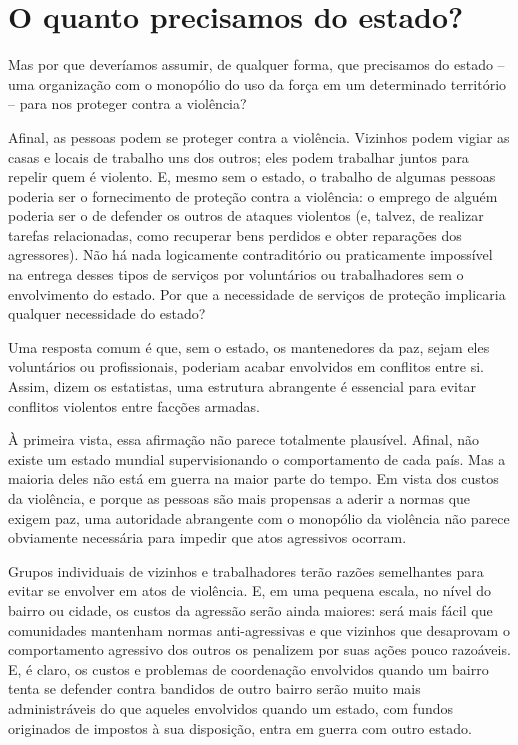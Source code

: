 \section{O quanto precisamos do estado?}

Mas por que deveríamos assumir, de qualquer forma, que precisamos do estado -- uma organização com o monopólio do uso da força em um determinado território -- para nos proteger contra a violência? 

Afinal, as pessoas podem se proteger contra a violência. Vizinhos podem vigiar as casas e locais de trabalho uns dos outros; eles podem trabalhar juntos para repelir quem é violento. E, mesmo sem o estado, o trabalho de algumas pessoas poderia ser o fornecimento de proteção contra a violência: o emprego de alguém poderia ser o de defender os outros de ataques violentos (e, talvez, de realizar tarefas relacionadas, como recuperar bens perdidos e obter reparações dos agressores). Não há nada logicamente contraditório ou praticamente impossível na entrega desses tipos de serviços por voluntários ou trabalhadores sem o envolvimento do estado. Por que a necessidade de serviços de proteção implicaria qualquer necessidade do estado?

Uma resposta comum é que, sem o estado, os mantenedores da paz, sejam eles voluntários ou profissionais, poderiam acabar envolvidos em conflitos entre si. Assim, dizem os estatistas, uma estrutura abrangente é essencial para evitar conflitos violentos entre facções armadas.

À primeira vista, essa afirmação não parece totalmente plausível. Afinal, não existe um estado mundial supervisionando o comportamento de cada país. Mas a maioria deles não está em guerra na maior parte do tempo. Em vista dos custos da violência, e porque as pessoas são mais propensas a aderir a normas que exigem paz, uma autoridade abrangente com o monopólio da violência não parece obviamente necessária para impedir que atos agressivos ocorram.

Grupos individuais de vizinhos e trabalhadores terão razões semelhantes para evitar se envolver em atos de violência. E, em uma pequena escala, no nível do bairro ou cidade, os custos da agressão serão ainda maiores: será mais fácil que comunidades mantenham normas anti-agressivas e que vizinhos que desaprovam o comportamento agressivo dos outros os penalizem por suas ações pouco razoáveis. E, é claro, os custos e problemas de coordenação envolvidos quando um bairro tenta se defender contra bandidos de outro bairro serão muito mais administráveis do que aqueles envolvidos quando um estado, com fundos originados de impostos à sua disposição, entra em guerra com outro estado.

